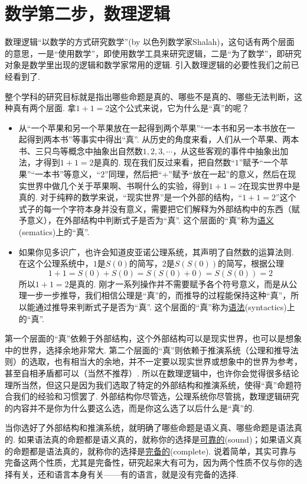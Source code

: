 \chapter{数学第二步，数理逻辑}

数理逻辑“以数学的方式研究数学”(by 以色列数学家Shalah)，这句话有两个层面的意思，一是“使用数学”，即使用数学工具来研究逻辑，二是“为了数学”，即研究对象是数学里出现的逻辑和数学家常用的逻辑. 引入数理逻辑的必要性我们之前已经看到了. 

整个学科的研究目标就是指出哪些命题是真的、哪些不是真的、哪些无法判断，这种真有两个层面. 拿\(1+1=2\)这个公式来说，它为什么是“真”的呢？
\begin{itemize}
    \item 从“一个苹果和另一个苹果放在一起得到两个苹果”“一本书和另一本书放在一起得到两本书”等事实中得出“真”. 从历史的角度来看，人们从一个苹果、两本书、三只鸟等概念中抽象出自然数\(1,2,3,\cdots\)，从这些客观的事件中抽象出加法，才得到\(1+1=2\)是真的. 现在我们反过来看，把自然数“\(1\)”赋予“一个苹果”“一本书”等意义，“\(2\)”同理，然后把“\(+\)”赋予“放在一起”的意义，然后在现实世界中做几个关于苹果啊、书啊什么的实验，得到\(1+1=2\)在现实世界中是真的. 对于纯粹的数学来说，“现实世界”是一个外部的结构，“\(1+1=2\)”这个式子的每一个字符本身并没有意义，需要把它们解释为外部结构中的东西（赋予意义），在外部结构中判断式子是否为“真”. 这个层面的“真”称为\underline{语义}(sematics)上的“真”.
    \item 如果你见多识广，也许会知道皮亚诺公理系统，其声明了自然数的运算法则. 在这个公理系统中，\(1\)是\(S(0)\)的简写，\(2\)是\(S(S(0))\)的简写，根据公理
    \[1+1=S(0)+S(0)=S(S(0)+0)=S(S(0))=2\]
    所以\(1+1=2\)是真的. 刚才一系列操作并不需要赋予各个符号意义，而是从公理一步一步推导，我们相信公理是“真”的，而推导的过程能保持这种“真”，所以能通过推导来判断式子是否为“真”. 这个层面的“真”称为\underline{语法}(syntactics)上的“真”.
\end{itemize}

第一个层面的“真”依赖于外部结构，这个外部结构可以是现实世界，也可以是想象中的世界，选择余地非常大. 第二个层面的“真”则依赖于推演系统（公理和推导法则）的选取，也有相当大的余地，并不一定要以现实世界或想象中的世界为参考，甚至自相矛盾都可以（当然不推荐）. 所以在数理逻辑中，也许你会觉得很多结论理所当然，但这只是因为我们选取了特定的外部结构和推演系统，使得“真”命题符合我们的经验和习惯罢了. 外部结构你尽管选，公理系统你尽管挑，数理逻辑研究的内容并不是你为什么要这么选，而是你这么选了以后什么是“真”的.

当你选好了外部结构和推演系统，就明确了哪些命题是语义真、哪些命题是语法真的. 如果语法真的命题都是语义真的，就称你的选择是\underline{可靠的}(sound)；如果语义真的命题都是语法真的，就称你的选择是\underline{完备的}(complete). 说着简单，其实可靠与完备这两个性质，尤其是完备性，研究起来大有可为，因为两个性质不仅与你的选择有关，还和语言本身有关——有的语言，就是没有完备的选择. 


